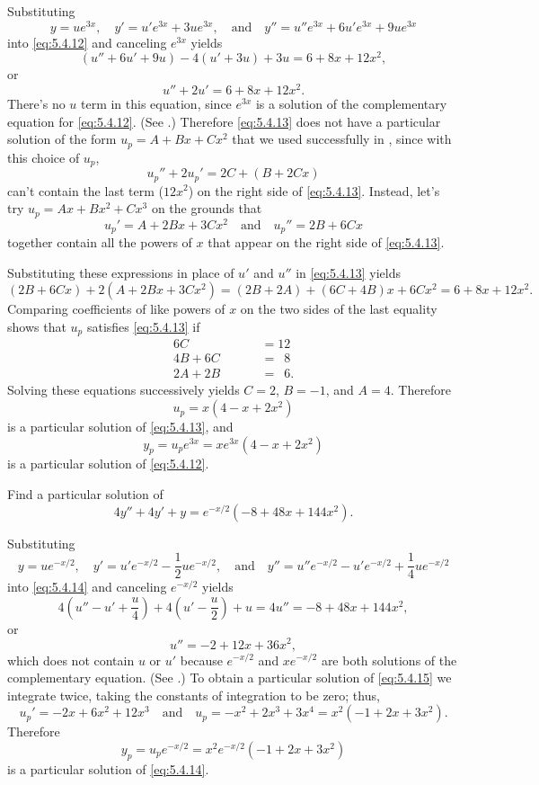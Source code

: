 \begin{solution}
Substituting
\[
y=ue^{3x},\quad y'=u'e^{3x}+3ue^{3x},\quad\text{and}\quad
y''=u''e^{3x}+6u'e^{3x}+9ue^{3x}
\]
into \eqref{eq:5.4.12} and  canceling $e^{3x}$  yields
\[
(u''+6u'+9u)-4(u'+3u)+3u=6+8x+12x^2,
\]
or
\begin{equation} \label{eq:5.4.13}
u''+2u'=6+8x+12x^2.
\end{equation}
There's no $u$ term in this equation, since $e^{3x}$ is a solution of
the complementary equation for \eqref{eq:5.4.12}. (See
.) Therefore \eqref{eq:5.4.13} does not have a
particular solution of the form $u_p=A+Bx+Cx^2$ that we used
successfully in , since with this choice of
$u_p$,
\[
u_p''+2u_p'=2C+(B+2Cx)
\]
can't contain the last term ($12x^2$) on the right side of
\eqref{eq:5.4.13}. Instead, let's try $u_p=Ax+Bx^2+Cx^3$ on the grounds
that
\[
u_p'=A+2Bx+3Cx^2\quad\text{and}\quad 
u_p''=2B+6Cx
\]
together contain all the powers of $x$ that appear on the right side
of \eqref{eq:5.4.13}.

Substituting these expressions in place of $u'$ and $u''$  in
\eqref{eq:5.4.13} yields
\[
(2B+6Cx)+2(A+2Bx+3Cx^2)=(2B+2A)+(6C+4B)x+6Cx^2=6+8x+12x^2.
\]
Comparing coefficients of like powers of $x$ on the two sides of the
last equality shows that $u_p$ satisfies \eqref{eq:5.4.13} if
\begin{align*}
6C&=12\\
4B+6C&=\phantom{1}8\\
2A+2B\phantom{{}+6C}&=\phantom{1}6.
\end{align*}
Solving these equations successively yields $C=2$, $B=-1$, and $A=4$.
Therefore
\[
u_p=x(4-x+2x^2)
\]
is a particular solution of  \eqref{eq:5.4.13},
and
\[
y_p=u_pe^{3x}=xe^{3x}(4-x+2x^2)
\]
is a particular solution of  \eqref{eq:5.4.12}.
\end{solution}

\begin{example}\label{example:5.4.6}
Find a particular solution of
\begin{equation} \label{eq:5.4.14}
4y''+4y'+y=e^{-x/2}(-8+48x+144x^2).
\end{equation}
\end{example}

\begin{solution}
Substituting
\[
y=ue^{-x/2},\quad  y'=u'e^{-x/2}-\frac{1}{2}ue^{-x/2},\quad\text{and}\quad
y''=u''e^{-x/2}-u'e^{-x/2}+\frac{1}{4}ue^{-x/2}
\]
into \eqref{eq:5.4.14} and  canceling $e^{-x/2}$  yields
\[
4\left(u''-u'+\frac{u}{4}\right)+4\left(u'-\frac{u}{2}\right)+u=4u''=-8+48x+144x^2,
\]
or
\begin{equation} \label{eq:5.4.15}
u''=-2+12x+36x^2,
\end{equation}
which does not contain $u$ or $u'$ because $e^{-x/2}$ and $xe^{-x/2}$
are both solutions of the complementary equation. (See
.) To obtain a particular solution of
\eqref{eq:5.4.15} we integrate twice, taking the constants of integration
to be zero;   thus,
\[
u_p'=-2x+6x^2+12x^3\quad\text{and}\quad 
u_p=-x^2+2x^3+3x^4=x^2(-1+2x+3x^2).
\]
Therefore
\[
y_p=u_pe^{-x/2}=x^2e^{-x/2}(-1+2x+3x^2)
\]
is a particular solution of  \eqref{eq:5.4.14}.
\end{solution}


